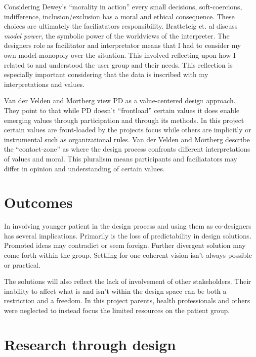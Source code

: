 \documentclass[UKenglish]{uiophd}
\begin{document}
		Considering Dewey’s ``morality in action''\cite[p.~70]{Robertson2006Ethical} every small decisions, soft-coercions, indifference, inclusion/exclusion has a moral and ethical consequence. These choices are ultimately the faciliatators responsibility. Bratteteig et. al discuss \textit{model power}, the symbolic power of the worldviews of the interpreter\cite[p.129]{Bratteteig2013Organising}. The designers role as facilitator and interpretator means that I had to consider my own model-monopoly over the situation. This involved reflecting upon how I related to and understood the user group and their needs. This reflection is especially important considering that the data is inscribed with my interpretations and values. 

		Van der Velden and Mörtberg view PD as a value-centered design approach\cite[p.6]{Velden2014Participatory}. They point to that while PD doesn't ``frontload'' certain values it does enable emerging values through participation and through its methods. In this project certain values are front-loaded by the projects focus while others are implicitly or instrumental such as organizational rules. Van der Velden and Mörtberg describe the ``contact-zone'' as where the design process confronts different interpretations of values and moral. This pluralism means participants and faciliatators may differ in opinion and understanding of certain values\cite[p.~8]{Velden2014Participatory}.

	\section{Outcomes}
		In involving younger patient in the design process and using them as co-designers has several implications. Primarily is the loss of predictability in design solutions. Promoted ideas may contradict or seem foreign. Further divergent solution may come forth within the group. Settling for one coherent vision isn't always possible or practical.

		The solutions will also reflect the lack of involvement of other stakeholders. Their inability to affect what is and isn't within the design space can be both a restriction and a freedom. In this project parents, health professionals and others were neglected to instead focus the limited resources on the patient group. 

	\section{Research through design}
\end{document}
